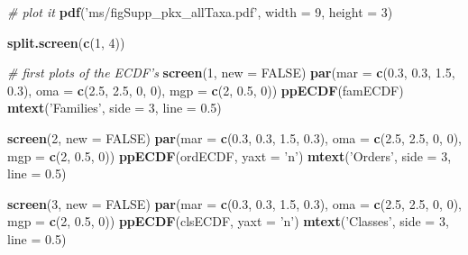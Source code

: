 \documentclass[]{article}
\newenvironment{Shaded}{\begin{snugshade}}{\end{snugshade}}
\newcommand{\KeywordTok}[1]{\textcolor[rgb]{0.13,0.29,0.53}{\textbf{#1}}}
\newcommand{\DataTypeTok}[1]{\textcolor[rgb]{0.13,0.29,0.53}{#1}}
\newcommand{\DecValTok}[1]{\textcolor[rgb]{0.00,0.00,0.81}{#1}}
\newcommand{\FloatTok}[1]{\textcolor[rgb]{0.00,0.00,0.81}{#1}}
\newcommand{\StringTok}[1]{\textcolor[rgb]{0.31,0.60,0.02}{#1}}
\newcommand{\CommentTok}[1]{\textcolor[rgb]{0.56,0.35,0.01}{\textit{#1}}}
\newcommand{\OtherTok}[1]{\textcolor[rgb]{0.56,0.35,0.01}{#1}}
\newcommand{\NormalTok}[1]{#1}
\begin{document}
\begin{Shaded}
\begin{Highlighting}[]
\CommentTok{# plot it}
\KeywordTok{pdf}\NormalTok{(}\StringTok{'ms/figSupp_pkx_allTaxa.pdf'}\NormalTok{, }\DataTypeTok{width =} \DecValTok{9}\NormalTok{, }\DataTypeTok{height =} \DecValTok{3}\NormalTok{)}

\KeywordTok{split.screen}\NormalTok{(}\KeywordTok{c}\NormalTok{(}\DecValTok{1}\NormalTok{, }\DecValTok{4}\NormalTok{))}

\CommentTok{# first plots of the ECDF's}
\KeywordTok{screen}\NormalTok{(}\DecValTok{1}\NormalTok{, }\DataTypeTok{new =} \OtherTok{FALSE}\NormalTok{)}
\KeywordTok{par}\NormalTok{(}\DataTypeTok{mar =} \KeywordTok{c}\NormalTok{(}\FloatTok{0.3}\NormalTok{, }\FloatTok{0.3}\NormalTok{, }\FloatTok{1.5}\NormalTok{, }\FloatTok{0.3}\NormalTok{), }\DataTypeTok{oma =} \KeywordTok{c}\NormalTok{(}\FloatTok{2.5}\NormalTok{, }\FloatTok{2.5}\NormalTok{, }\DecValTok{0}\NormalTok{, }\DecValTok{0}\NormalTok{), }
    \DataTypeTok{mgp =} \KeywordTok{c}\NormalTok{(}\DecValTok{2}\NormalTok{, }\FloatTok{0.5}\NormalTok{, }\DecValTok{0}\NormalTok{))}
\KeywordTok{ppECDF}\NormalTok{(famECDF)}
\KeywordTok{mtext}\NormalTok{(}\StringTok{'Families'}\NormalTok{, }\DataTypeTok{side =} \DecValTok{3}\NormalTok{, }\DataTypeTok{line =} \FloatTok{0.5}\NormalTok{)}

\KeywordTok{screen}\NormalTok{(}\DecValTok{2}\NormalTok{, }\DataTypeTok{new =} \OtherTok{FALSE}\NormalTok{)}
\KeywordTok{par}\NormalTok{(}\DataTypeTok{mar =} \KeywordTok{c}\NormalTok{(}\FloatTok{0.3}\NormalTok{, }\FloatTok{0.3}\NormalTok{, }\FloatTok{1.5}\NormalTok{, }\FloatTok{0.3}\NormalTok{), }\DataTypeTok{oma =} \KeywordTok{c}\NormalTok{(}\FloatTok{2.5}\NormalTok{, }\FloatTok{2.5}\NormalTok{, }\DecValTok{0}\NormalTok{, }\DecValTok{0}\NormalTok{), }
    \DataTypeTok{mgp =} \KeywordTok{c}\NormalTok{(}\DecValTok{2}\NormalTok{, }\FloatTok{0.5}\NormalTok{, }\DecValTok{0}\NormalTok{))}
\KeywordTok{ppECDF}\NormalTok{(ordECDF, }\DataTypeTok{yaxt =} \StringTok{'n'}\NormalTok{)}
\KeywordTok{mtext}\NormalTok{(}\StringTok{'Orders'}\NormalTok{, }\DataTypeTok{side =} \DecValTok{3}\NormalTok{, }\DataTypeTok{line =} \FloatTok{0.5}\NormalTok{)}

\KeywordTok{screen}\NormalTok{(}\DecValTok{3}\NormalTok{, }\DataTypeTok{new =} \OtherTok{FALSE}\NormalTok{)}
\KeywordTok{par}\NormalTok{(}\DataTypeTok{mar =} \KeywordTok{c}\NormalTok{(}\FloatTok{0.3}\NormalTok{, }\FloatTok{0.3}\NormalTok{, }\FloatTok{1.5}\NormalTok{, }\FloatTok{0.3}\NormalTok{), }\DataTypeTok{oma =} \KeywordTok{c}\NormalTok{(}\FloatTok{2.5}\NormalTok{, }\FloatTok{2.5}\NormalTok{, }\DecValTok{0}\NormalTok{, }\DecValTok{0}\NormalTok{), }
    \DataTypeTok{mgp =} \KeywordTok{c}\NormalTok{(}\DecValTok{2}\NormalTok{, }\FloatTok{0.5}\NormalTok{, }\DecValTok{0}\NormalTok{))}
\KeywordTok{ppECDF}\NormalTok{(clsECDF, }\DataTypeTok{yaxt =} \StringTok{'n'}\NormalTok{)}
\KeywordTok{mtext}\NormalTok{(}\StringTok{'Classes'}\NormalTok{, }\DataTypeTok{side =} \DecValTok{3}\NormalTok{, }\DataTypeTok{line =} \FloatTok{0.5}\NormalTok{)}


\end{Highlighting}
\end{Shaded}
\end{document}
